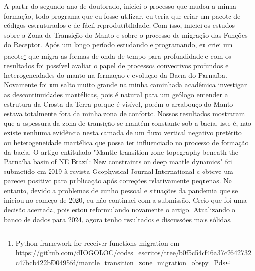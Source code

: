 \documentclass[10pt,a4paper,oneside]{book}
\begin{document}
A partir do segundo ano de doutorado, iniciei o processo que mudou a minha formação, todo programa que eu fosse utilizar, eu teria que criar um pacote de códigos estruturados e de fácil reprodutibilidade. Com isso, iniciei os estudos sobre a Zona de Transição do Manto e sobre o processo de migração das Funções do Receptor. Após um longo período estudando e programando, eu criei um pacote\footnote{Python framework for receiver functions migration em \url{https://github.com/dIOGOLOC/codes_escritos/tree/b0f5c54cf46a37c2642732c47bcb422bf00495fd/mantle_transition_zone_migration_obspy_Pds}} que migra as formas de onda de tempo para profundidade e com os resultados foi possível avaliar o papel de processos convectivos profundos e heterogeneidades do manto na formação e evolução da Bacia do Parnaíba. Novamente foi um salto muito grande na minha caminhada acadêmica investigar as descontinuidades mantélicas, pois é natural para um geólogo entender a estrutura da Crosta da Terra porque é visível, porém o arcabouço do Manto estava totalmente fora da minha zona de conforto. Nossos resultados mostraram que a espessura da zona de transição se mantém constante sob a bacia, isto é, não existe nenhuma evidência nesta camada de um fluxo vertical negativo pretérito ou heterogeneidade mantélica que possa ter influenciado no processo de formação da bacia. O artigo entitulado "Mantle transition zone topography beneath the Parnaíba basin of NE Brazil: New constraints on deep mantle dynamics" foi submetido em 2019 à revista Geophysical Journal International e obteve um parecer positivo para publicação após correções relativamente pequenas. No entanto, devido a problemas de cunho pessoal e situações da pandemia que se iniciou no começo de 2020, eu não continuei com a submissão. Creio que foi uma decisão acertada, pois estou reformulando novamente o artigo. Atualizando o banco de dados para 2024, agora tenho resultados e discussões mais sólidas.

\bigskip
\end{document}
